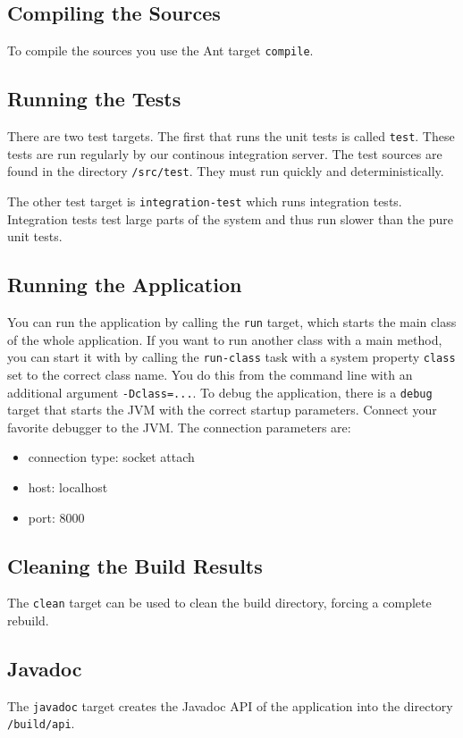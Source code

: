 \documentclass[11pt,a4paper]{article}
\begin{document}
\subsection{Compiling the Sources}
To compile the sources you use the Ant target \texttt{compile}. 


\subsection{Running the Tests}
There are two test targets. The first that runs the unit tests is called
\texttt{test}. These tests are run regularly by our continous integration
server. The test sources are found in the directory \texttt{/src/test}. They
must run quickly and deterministically.

The other test target is \texttt{integration-test} which runs integration tests.
Integration tests test large parts of the system and thus run slower than
the pure unit tests.


\subsection{Running the Application}
You can run the application by calling the \texttt{run} target, which starts
the main class of the whole application. If you want to run another class
with a main method, you can start it with by calling the \texttt{run-class}
task with a system property \texttt{class} set to the correct class name.
You do this from the command line with an additional argument 
\texttt{-Dclass=...}. To debug the application, there is a \texttt{debug}
target that starts the JVM with the correct startup parameters. Connect
your favorite debugger to the JVM. The connection parameters are:
\begin{itemize}
 \item connection type: socket attach
 \item host: localhost
 \item port: 8000
\end{itemize}


\subsection{Cleaning the Build Results}
The \texttt{clean} target can be used to clean the build directory,
forcing a complete rebuild.


\subsection{Javadoc}
The \texttt{javadoc} target creates the Javadoc API of the application into the
directory \texttt{/build/api}.
\end{document}
